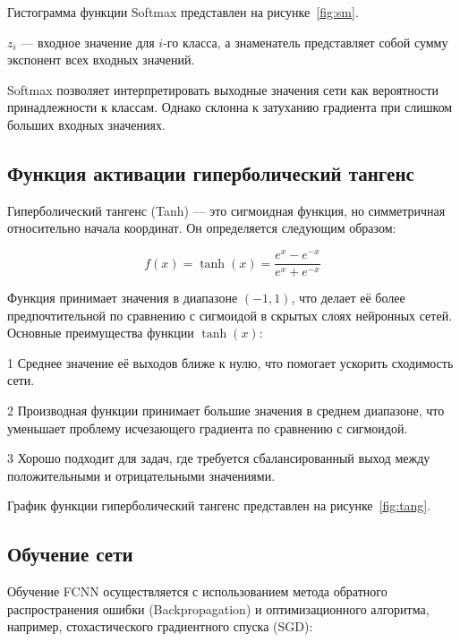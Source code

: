 Гистограмма функции Softmax представлен на рисунке~\ref{fig:sm}.


 $z_i$ — входное значение для $i$-го класса, а знаменатель 
представляет собой сумму экспонент всех входных значений.

Softmax позволяет интерпретировать выходные значения сети как вероятности 
принадлежности к классам. Однако склонна к затуханию градиента при слишком 
больших входных значениях.

\subsection{Функция активации гиперболический тангенс}
\hspace*{12.5 mm}Гиперболический тангенс (Tanh) — это сигмоидная функция, но 
симметричная относительно начала координат. Он определяется следующим образом:

\begin{equation}
    f(x) = \tanh(x) = \frac{e^x - e^{-x}}{e^x + e^{-x}}
\end{equation}

Функция принимает значения в диапазоне $(-1, 1)$, что делает её более 
предпочтительной по сравнению с сигмоидой в скрытых слоях нейронных сетей. 
Основные преимущества функции $\tanh(x)$:

1 Среднее значение её выходов ближе к нулю, что помогает ускорить сходимость 
сети.

2 Производная функции принимает большие значения в среднем диапазоне, что 
уменьшает проблему исчезающего градиента по сравнению с сигмоидой.

3 Хорошо подходит для задач, где требуется сбалансированный выход между 
положительными и отрицательными значениями.

График функции гиперболический тангенс представлен на рисунке~\ref{fig:tang}.


\subsection{Обучение сети}
\hspace*{12.5 mm}Обучение FCNN осуществляется с использованием метода обратного 
распространения ошибки (Backpropagation) и оптимизационного алгоритма, 
например, стохастического градиентного спуска (SGD):

